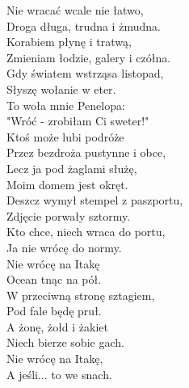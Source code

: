 Nie wracać wcale nie łatwo, \\
Droga długa, trudna i żmudna. \\
Korabiem płynę i tratwą, \\
Zmieniam łodzie, galery i czółna. \\
Gdy światem wstrząsa listopad, \\
Słyszę wołanie w eter. \\
To woła mnie Penelopa: \\
"Wróć - zrobiłam Ci sweter!" \\

Ktoś może lubi podróże \\
Przez bezdroża pustynne i obce, \\
Lecz ja pod żaglami służę, \\
Moim domem jest okręt. \\
Deszcz wymył stempel z paszportu, \\
Zdjęcie porwały sztormy. \\
Kto chce, niech wraca do portu, \\
Ja nie wrócę do normy. \\

Nie wrócę na Itakę \\
Ocean tnąc na pół. \\
W przeciwną stronę sztagiem, \\
Pod fale będę pruł. \\
A żonę, żołd i żakiet \\
Niech bierze sobie gach. \\
Nie wrócę na Itakę, \\
A jeśli... to we snach. \\